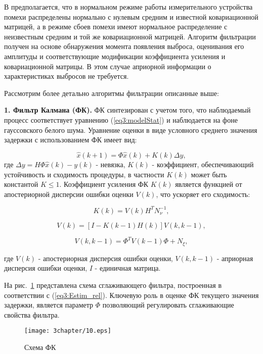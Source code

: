 В \cite{Klekis} предполагается, что в нормальном режиме работы измерительного устройства помехи распределены нормально с нулевым средним и известной ковариационной матрицей, а в режиме сбоев помехи имеют нормальное распределение с неизвестным средним и той же ковариационной матрицей.
Алгоритм фильтрации получен на основе обнаружения момента появления выброса, оценивания его амплитуды и соответствующие модификации коэффициента усиления и ковариационной матрицы. В этом случае априорной информации о характеристиках выбросов не требуется.  

Рассмотрим более детально алгоритмы фильтрации описанные выше:

\textbf{1. Фильтр Калмана (ФК).}
 ФК синтезирован с учетом того, что наблюдаемый процесс соответствует уравнению (\ref{eq3:modelStat}) и наблюдается на фоне гауссовского белого шума.
 Уравнение оценки в виде условного среднего значения задержки с использованием ФК имеет вид:


\begin{equation}\label{eq3:Estim_rel}
\hat{x}(k+1)=\Phi\hat{x}(k)+K(k)\Delta y,
\end{equation}
\noindent где $\Delta y=H\Phi\hat{x}(k)-y(k)$ - невязка, $K(k)$ - коэффициент, обеспечивающий устойчивость и сходимость процедуры, в частности $K(k)$ может быть константой $K\leq1$. Коэффициент усиления ФК $K(k)$ является функцией от апостериорной дисперсии ошибки оценки $V(k)$, что ускоряет его сходимость:

\begin{equation}\label{eq3:K}
K(k)=V(k)H^TN_{\nu}^{-1},
\end{equation}
 
\begin{equation}\label{eq3:V}
V(k)=[I-K(k-1)H(k)]V(k,k-1),
\end{equation}


\begin{equation}\label{eq3:Vkk-1}
V(k,k-1)=\Phi^TV(k-1)\Phi+N_\xi,
\end{equation}

\noindent где $V(k)$ - апостериорная дисперсия ошибки оценки, $V(k,k-1)$ - априорная дисперсия ошибки оценки, $I$ - единичная матрица.

На рис. \ref{img3:kalmanF} представлена схема сглаживающего фильтра, построенная в соответствии с (\ref{eq3:Estim_rel}). Ключевую роль в оценке ФК текущего значения задержки, является параметр $\Phi$ позволяющий регулировать сглаживающие свойства фильтра. 

\begin{figure} [h]
  \center
\texttt{[image: 3chapter/10.eps]}
  \caption{Схема ФК}
  \label{img3:kalmanF}
\end{figure}


